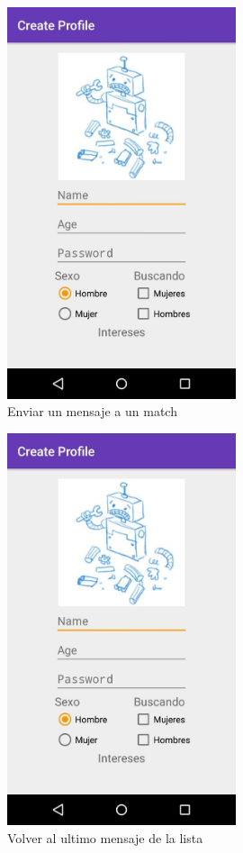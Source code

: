 \documentclass[10pt,letterpaper,extrafontsizes]{memoir}
\begin{document}
\begin{figure}[H]
    \centering
\includegraphics[width=0.6\textwidth]{graficos/capturas/i}
    \caption{Enviar un mensaje a un match}
    \label{fig:charSend}
\end{figure}

\begin{figure}[H]
    \centering
\includegraphics[width=0.6\textwidth]{graficos/capturas/i}
    \caption{Volver al ultimo mensaje de la lista}
    \label{fig:chatDown}
\end{figure}
\end{document}
